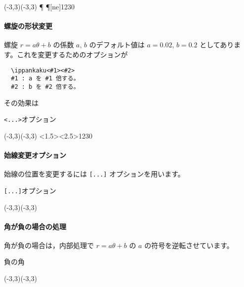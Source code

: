 \begin{showEx}{}
\small
\begin{zahyou}(-3,3)(-3,3)%
%
\P
{}%
\Put\P[ne]{1230\Deg}%
\end{zahyou}
\end{showEx}

\paragraph{螺旋の形状変更}
螺旋 $r=a\theta+b$ の係数 $a$, $b$ のデフォルト値は
$a=0.02$, $b=0.2$ としてあります。これを変更するためのオプションが
\begin{jquote}
\begin{verbatim}
  \ippankaku<#1><#2>
  #1 : a を #1 倍する。
  #2 : b を #2 倍する。
\end{verbatim}
\end{jquote}

その効果は

\begin{showEx}{\texttt{<...>}オプション}
\small
\begin{zahyou}(-3,3)(-3,3)%
\ippankaku<1.5><2.5>{1230}%
%
\end{zahyou}
\end{showEx}

\paragraph{始線変更オプション}
始線の位置を変更するには \texttt{[...]} オプションを用います。

\begin{showEx}{\texttt{[...]}オプション}
\small
\begin{zahyou}(-3,3)(-3,3)%
%
\def\O{(0,0)}%
%
%
\end{zahyou}
\end{showEx}
\bigskip

\paragraph{角が負の場合の処理}
角が負の場合は，内部処理で $r=a\theta+b$ の $a$ の符号を逆転させています。

\begin{showEx}{負の角}
\small
\begin{zahyou}(-3,3)(-3,3)%
%
%
\end{zahyou}
\end{showEx}
\bigskip

